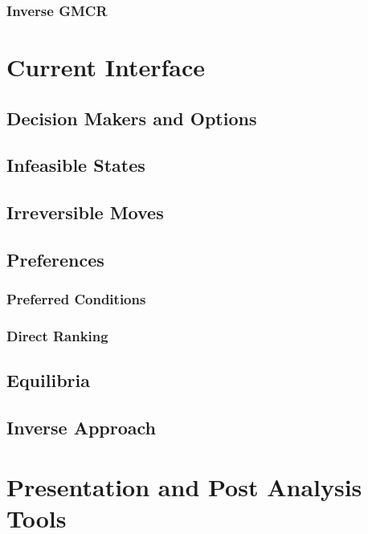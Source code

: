 \documentclass[letterpaper,12pt,titlepage,oneside,final]{book}
\begin{document}
\subsubsection{Inverse GMCR}





\section{Current Interface}

\subsection{Decision Makers and Options}

\subsection{Infeasible States}

\subsection{Irreversible Moves}


\subsection{Preferences}


\subsubsection{Preferred Conditions}

\subsubsection{Direct Ranking}


\subsection{Equilibria}

\subsection{Inverse Approach}

\section{Presentation and Post Analysis Tools}
\end{document}
